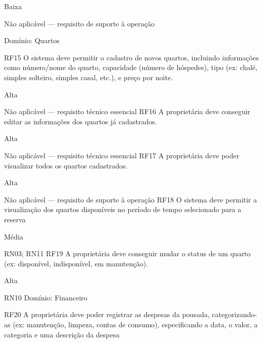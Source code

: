 Baixa
	



Não aplicável — requisito de suporte à operação


	Domínio: Quartos 
	

	

	RF15
	O sistema deve permitir o cadastro de novos quartos, incluindo informações como número/nome do quarto, capacidade (número de hóspedes), tipo (ex: chalé, simples solteiro, simples casal, etc.), e preço por noite.
	









Alta
	









Não aplicável — requisito técnico essencial
	RF16
	A proprietária deve conseguir editar as informações dos quartos já cadastrados.
	



Alta
	

Não aplicável — requisito técnico essencial
	RF17
	A proprietária deve poder visualizar todos os quartos cadastrados.
	

Alta
	

Não aplicável — requisito de suporte à operação
	RF18
	O sistema deve permitir a visualização dos quartos disponíveis no período de tempo selecionado para a reserva
	





Média
	





RN03; RN11
	RF19
	A proprietária deve conseguir mudar o status de um quarto (ex: disponível, indisponível, em manutenção).


	





Alta
	





RN10 
	Domínio: Financeiro
	

	

	RF20
	A proprietária deve poder registrar as despesas da pousada, categorizando-as (ex: manutenção, limpeza, contas de consumo), especificando a data, o valor, a categoria e uma descrição da despesa
	









